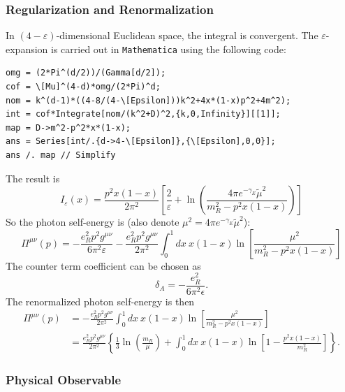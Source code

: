 \documentclass[aps,prb,superscriptaddress,nofootinbib]{revtex4}
\begin{document}
\subsubsection{Regularization and Renormalization}
In $(4-\varepsilon)$-dimensional Euclidean space, the integral is convergent.
The $\varepsilon$-expansion is carried out in \texttt{Mathematica} using the following code:

\begin{lstlisting}[style=mathematicaFrameTB]
omg = (2*Pi^(d/2))/(Gamma[d/2]);
cof = \[Mu]^(4-d)*omg/(2*Pi)^d;
nom = k^(d-1)*((4-8/(4-\[Epsilon]))k^2+4x*(1-x)p^2+4m^2);
int = cof*Integrate[nom/(k^2+D)^2,{k,0,Infinity}][[1]];
map = D->m^2-p^2*x*(1-x);
ans = Series[int/.{d->4-\[Epsilon]},{\[Epsilon],0,0}];
ans /. map // Simplify
\end{lstlisting}

The result is
\begin{equation}
	I_\varepsilon(x) = \frac{p^2 x(1-x)}{2\pi^2} \left[\frac{2}{\varepsilon}+\ln\left(\frac{4\pi e^{-\gamma_E} \tilde\mu^2}{m_R^2-p^2 x(1-x)}\right)\right]
\end{equation}
So the photon self-energy is (also denote $\mu^2=4\pi e^{-\gamma_E} \tilde\mu^2$):
\begin{equation}
	\Pi^{\mu\nu}(p) 
	= -\frac{e_R^2 p^2 g^{\mu\nu}}{6\pi^2 \varepsilon} 
	-\frac{e_R^2 p^2 g^{\mu\nu}}{2\pi^2} \int_0^1 dx\ x(1-x)
	\ln\left[\frac{\mu^2}{m_R^2-p^2 x(1-x)}\right]
\end{equation}
The counter term coefficient can be chosen as
\begin{equation}
	\delta_A = -\frac{e_R^2}{6\pi^2 \epsilon}.
\end{equation}
The renormalized photon self-energy is then
\begin{equation}
\begin{aligned}
	\Pi^{\mu\nu}(p) 
	&= -\frac{e_R^2 p^2 g^{\mu\nu}}{2\pi^2} \int_0^1 dx\ x(1-x)
	\ln\left[\frac{\mu^2}{m_R^2-p^2 x(1-x)}\right] \\
	&= \frac{e_R^2 p^2 g^{\mu\nu}}{2\pi^2} \left\{\frac{1}{3}\ln\left(\frac{m_R}{\mu}\right)
	 + \int_0^{1} dx\ x(1-x) \ln\left[1-\frac{p^2 x(1-x)}{m_R^2}\right] \right\}.
\end{aligned}
\end{equation}


\subsubsection{Physical Observable}
\end{document}
